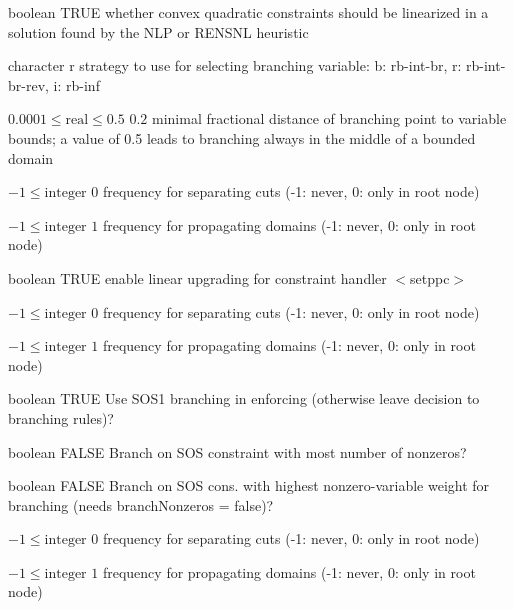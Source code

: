 %
{boolean}%
{TRUE}%
{whether convex quadratic constraints should be linearized in a solution found by the NLP or RENSNL heuristic}%
{}

%
{character}%
{r}%
{strategy to use for selecting branching variable: b: rb-int-br, r: rb-int-br-rev, i: rb-inf}%
{}

%
{$0.0001\leq\textrm{real}\leq0.5$}%
{$0.2$}%
{minimal fractional distance of branching point to variable bounds; a value of 0.5 leads to branching always in the middle of a bounded domain}%
{}

%
{$-1\leq\textrm{integer}$}%
{$0$}%
{frequency for separating cuts (-1: never, 0: only in root node)}%
{}

%
{$-1\leq\textrm{integer}$}%
{$1$}%
{frequency for propagating domains (-1: never, 0: only in root node)}%
{}

%
{boolean}%
{TRUE}%
{enable linear upgrading for constraint handler $<$setppc$>$}%
{}

%
{$-1\leq\textrm{integer}$}%
{$0$}%
{frequency for separating cuts (-1: never, 0: only in root node)}%
{}

%
{$-1\leq\textrm{integer}$}%
{$1$}%
{frequency for propagating domains (-1: never, 0: only in root node)}%
{}

%
{boolean}%
{TRUE}%
{Use SOS1 branching in enforcing (otherwise leave decision to branching rules)?}%
{}

%
{boolean}%
{FALSE}%
{Branch on SOS constraint with most number of nonzeros?}%
{}

%
{boolean}%
{FALSE}%
{Branch on SOS cons. with highest nonzero-variable weight for branching (needs branchNonzeros = false)?}%
{}

%
{$-1\leq\textrm{integer}$}%
{$0$}%
{frequency for separating cuts (-1: never, 0: only in root node)}%
{}

%
{$-1\leq\textrm{integer}$}%
{$1$}%
{frequency for propagating domains (-1: never, 0: only in root node)}%
{}

